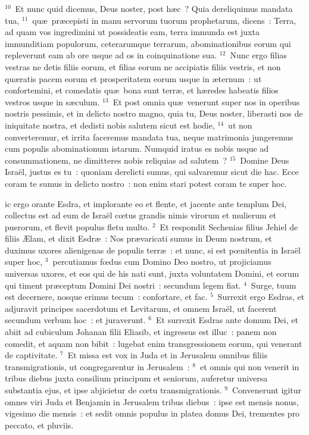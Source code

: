 ${}^{10}$~Et nunc quid dicemus, Deus noster, post h\ae c~? Quia dereliquimus mandata tua,
${}^{11}$~qu\ae\ pr\ae cepisti in manu servorum tuorum prophetarum, dicens~: Terra, ad quam vos ingredimini ut possideatis eam, terra immunda est juxta immunditiam populorum, ceterarumque terrarum, abominationibus eorum qui repleverunt eam ab ore usque ad os in coinquinatione sua.
${}^{12}$~Nunc ergo filias vestras ne detis filiis eorum, et filias eorum ne accipiatis filiis vestris, et non qu\ae ratis pacem eorum et prosperitatem eorum usque in \ae ternum~: ut confortemini, et comedatis qu\ae\ bona sunt terr\ae , et h\ae redes habeatis filios vestros usque in s\ae culum.
${}^{13}$~Et post omnia qu\ae\ venerunt super nos in operibus nostris pessimis, et in delicto nostro magno, quia tu, Deus noster, liberasti nos de iniquitate nostra, et dedisti nobis salutem sicut est hodie,
${}^{14}$~ut non converteremur, et irrita faceremus mandata tua, neque matrimonia jungeremus cum populis abominationum istarum. Numquid iratus es nobis usque ad consummationem, ne dimitteres nobis reliquias ad salutem~?
${}^{15}$~Domine Deus Isra\"el, justus es tu~: quoniam derelicti sumus, qui salvaremur sicut die hac. Ecce coram te sumus in delicto nostro~: non enim stari potest coram te super hoc.

\bchapter
{}ic ergo orante Esdra, et implorante eo et flente, et jacente ante templum Dei, collectus est ad eum de Isra\"el cœtus grandis nimis virorum et mulierum et puerorum, et flevit populus fletu multo.
${}^{2}$~Et respondit Sechenias filius Jehiel de filiis \AE lam, et dixit Esdr\ae~: Nos pr\ae varicati sumus in Deum nostrum, et duximus uxores alienigenas de populis terr\ae~: et nunc, si est pœnitentia in Isra\"el super hoc,
${}^{3}$~percutiamus fœdus cum Domino Deo nostro, ut projiciamus universas uxores, et eos qui de his nati sunt, juxta voluntatem Domini, et eorum qui timent pr\ae ceptum Domini Dei nostri~: secundum legem fiat.
${}^{4}$~Surge, tuum est decernere, nosque erimus tecum~: confortare, et fac.
${}^{5}$~Surrexit ergo Esdras, et adjuravit principes sacerdotum et Levitarum, et omnem Isra\"el, ut facerent secundum verbum hoc~: et juraverunt.
${}^{6}$~Et surrexit Esdras ante domum Dei, et abiit ad cubiculum Johanan filii Eliasib, et ingressus est illuc~: panem non comedit, et aquam non bibit~: lugebat enim transgressionem eorum, qui venerant de captivitate.
${}^{7}$~Et missa est vox in Juda et in Jerusalem omnibus filiis transmigrationis, ut congregarentur in Jerusalem~:
${}^{8}$~et omnis qui non venerit in tribus diebus juxta consilium principum et seniorum, auferetur universa substantia ejus, et ipse abjicietur de cœtu transmigrationis.
${}^{9}$~Convenerunt igitur omnes viri Juda et Benjamin in Jerusalem tribus diebus~: ipse est mensis nonus, vigesimo die mensis~: et sedit omnis populus in platea domus Dei, trementes pro peccato, et pluviis.


